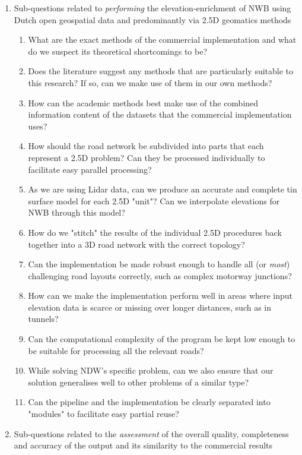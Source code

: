 \begin{enumerate}
    \item Sub-questions related to \textit{performing} the elevation-enrichment of NWB using Dutch open geospatial data and predominantly via 2.5D geomatics methods
    \begin{enumerate}
        \item What are the exact methods of the commercial implementation and what do we suspect its theoretical shortcomings to be?
        \item Does the literature suggest any methods that are particularly suitable to this research? If so, can we make use of them in our own methods?
        \item How can the academic methods best make use of the combined information content of the datasets that the commercial implementation uses?
        \item How should the road network be subdivided into parts that each represent a 2.5D problem? Can they be processed individually to facilitate easy parallel processing?
        \item As we are using Lidar data, can we produce an accurate and complete \ac{tin} surface model for each 2.5D "unit"? Can we interpolate elevations for NWB through this model?
        \item How do we "stitch" the results of the individual 2.5D procedures back together into a 3D road network with the correct topology?
        \item Can the implementation be made robust enough to handle all (or \textit{most}) challenging road layouts correctly, such as complex motorway junctions?
        \item How can we make the implementation perform well in areas where input elevation data is scarce or missing over longer distances, such as in tunnels?
        \item Can the computational complexity of the program be kept low enough to be suitable for processing all the relevant roads?
        \item While solving NDW's specific problem, can we also ensure that our solution generalises well to other problems of a similar type?
        \item Can the pipeline and the implementation be clearly separated into "modules" to facilitate easy partial reuse?
    \end{enumerate}
    \item Sub-questions related to the \textit{assessment} of the overall quality, completeness and accuracy of the output and its similarity to the commercial results

\end{enumerate}
